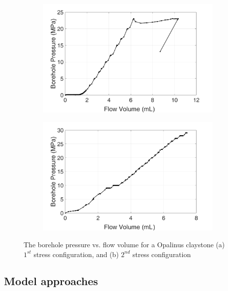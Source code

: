 \begin{figure}[!ht]
\begin{subfigure}[c]{0.48\textwidth}
\includegraphics[width=1\textwidth]{figures/Amir_Percolation_Flow_a.png}
\subcaption{}
\label{fig:Amir_Percolation_Flow_a}
\end{subfigure}
\hfill
\begin{subfigure}[c]{0.48\textwidth}
\includegraphics[width=1\textwidth]{figures/Amir_Percolation_Flow_b.png}
\subcaption{}
\label{fig:Amir_Percolation_Flow_b}
\end{subfigure}
\caption{The borehole pressure vs. flow volume for a Opalinus claystone (a) $1^{st}$ stress configuration, and (b) $2^{nd}$ stress configuration}
\end{figure}

\subsection{Model approaches}

